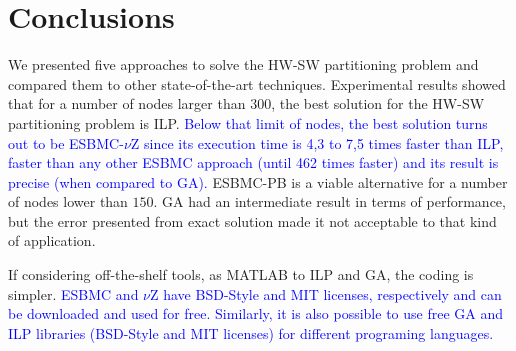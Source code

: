 \documentclass{doublecol-new}
\theoremstyle{TH}{
\newtheorem{lemma}{Lemma}
\newtheorem{theorem}[lemma]{Theorem}
\newtheorem{corrolary}[lemma]{Corrolary}
\newtheorem{conjecture}[lemma]{Conjecture}
\newtheorem{proposition}[lemma]{Proposition}
\newtheorem{claim}[lemma]{Claim}
\newtheorem{stheorem}[lemma]{Wrong Theorem}
\newtheorem{algorithm}{Algorithm}
}
\theoremstyle{THrm}{
\newtheorem{definition}{Definition}[section]
\newtheorem{question}{Question}[section]
\newtheorem{remark}{Remark}
\newtheorem{scheme}{Scheme}
}
\theoremstyle{THhit}{
\newtheorem{case}{Case}[section]
}
\begin{document}


\vspace {-4 mm}
\section{Conclusions}
\label{Conclusions}

We presented five approaches to solve the HW-SW partitioning problem and compared them to other state-of-the-art techniques. Experimental results showed that for a number of nodes larger than $300$, the best solution for the HW-SW partitioning problem is ILP. \textcolor{blue}{Below that limit of nodes, the best solution turns out to be ESBMC-$\nu$Z since its execution time is 4,3 to 7,5 times faster than ILP, faster than any other ESBMC approach (until 462 times faster) and its result is precise (when compared to GA).} ESBMC-PB is a viable alternative for a number of nodes lower than $150$. GA had an intermediate result in terms of performance, but the error presented from exact solution made it not acceptable to that kind of application. 

If considering off-the-shelf tools, as MATLAB to ILP and GA, the coding is simpler. \textcolor{blue}{ESBMC and $\nu$Z have BSD-Style and MIT licenses, respectively and can be downloaded and used for free. Similarly, it is also possible to use free GA and ILP libraries (BSD-Style and MIT licenses) for different programing languages.} 
\end{document}
